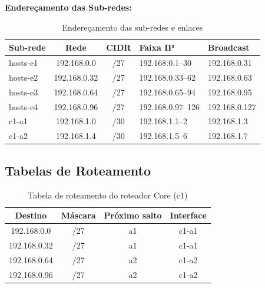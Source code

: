 \documentclass[conference,compsoc]{IEEEtran}
\begin{document}
\begin{otherlanguage}{brazil}
\textbf{Endereçamento das Sub-redes:}

\begin{table}[h]
\small
\begin{tabularx}{\linewidth}{|l|c|c|X|X|}
\hline
Sub-rede & Rede & CIDR & Faixa IP & Broadcast \\
\hline
hosts-e1 & 192.168.0.0 & /27 & 192.168.0.1--30 & 192.168.0.31 \\
\hline
hosts-e2 & 192.168.0.32 & /27 & 192.168.0.33--62 & 192.168.0.63 \\
\hline
hosts-e3 & 192.168.0.64 & /27 & 192.168.0.65--94 & 192.168.0.95 \\
\hline
hosts-e4 & 192.168.0.96 & /27 & 192.168.0.97--126 & 192.168.0.127 \\
\hline
c1-a1 & 192.168.1.0 & /30 & 192.168.1.1--2 & 192.168.1.3 \\
\hline
c1-a2 & 192.168.1.4 & /30 & 192.168.1.5--6 & 192.168.1.7 \\
\hline
\end{tabularx}
\caption{Endereçamento das sub-redes e enlaces}
\end{table}


\subsection{Tabelas de Roteamento}

\begin{table}[h]
\centering
\small
\begin{tabular}{|c|c|c|c|}
\hline
Destino & Máscara & Próximo salto & Interface \\
\hline
192.168.0.0 & /27 & a1 & c1-a1 \\
192.168.0.32 & /27 & a1 & c1-a1 \\
192.168.0.64 & /27 & a2 & c1-a2 \\
192.168.0.96 & /27 & a2 & c1-a2 \\
\hline
\end{tabular}
\caption{Tabela de roteamento do roteador Core (c1)}
\end{table}


\end{otherlanguage}
\end{document}
